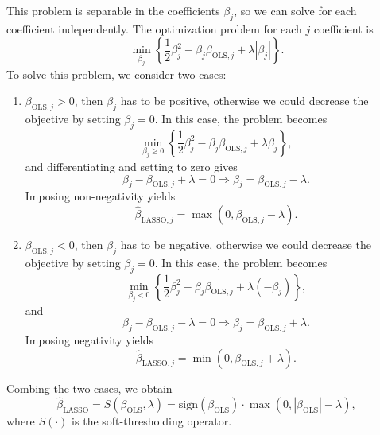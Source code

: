 This problem is separable in the coefficients $\beta_j$, so we can solve for each coefficient independently. The optimization problem for each $j$ coefficient is
\[\min_{\beta_j} \left\{\frac{1}{2} \beta_j^2 - \beta_j \beta_{\text{OLS},j} + \lambda |\beta_j| \right\}.\]
To solve this problem, we consider two cases:
\begin{enumerate}
    \item $\beta_{\text{OLS},j} > 0$, then $\beta_j$ has to be positive, otherwise we could decrease the objective by setting $\beta_j = 0$. 
    In this case, the problem becomes 
    \[\min_{\beta_j \geq 0} \left\{ \frac{1}{2} \beta_j^2 - \beta_j \beta_{\text{OLS},j} + \lambda \beta_j \right\},\]
    and differentiating and setting to zero gives
    \[\beta_j - \beta_{\text{OLS},j} + \lambda = 0 \Rightarrow \beta_j = \beta_{\text{OLS},j} - \lambda.\]
    Imposing non-negativity yields
    \[\hat{\beta}_{\text{LASSO},j} = \max\left(0, \beta_{\text{OLS},j} - \lambda\right).\]
    \item $\beta_{\text{OLS},j} < 0$, then $\beta_j$ has to be negative, otherwise we could decrease the objective by setting $\beta_j = 0$. In this case, the problem becomes
    \[\min_{\beta_j < 0} \left\{ \frac{1}{2} \beta_j^2 - \beta_j \beta_{\text{OLS},j} + \lambda (-\beta_j) \right\},\]    
    and
    \[\beta_j - \beta_{\text{OLS},j} - \lambda = 0 \Rightarrow \beta_j = \beta_{\text{OLS},j} + \lambda.\]
    Imposing negativity yields
    \[\hat{\beta}_{\text{LASSO},j} = \min\left(0, \beta_{\text{OLS},j} + \lambda\right).\]
\end{enumerate}

Combing the two cases, we obtain 
\begin{equation}
\hat{\beta}_{\text{LASSO}} = S(\beta_{\text{OLS}}, \lambda) = \textrm{sign}(\beta_{\text{OLS}}) \cdot \max\left(0, |\beta_{\text{OLS}}| - \lambda\right),
\end{equation}
where $S(\cdot)$ is the soft-thresholding operator.


